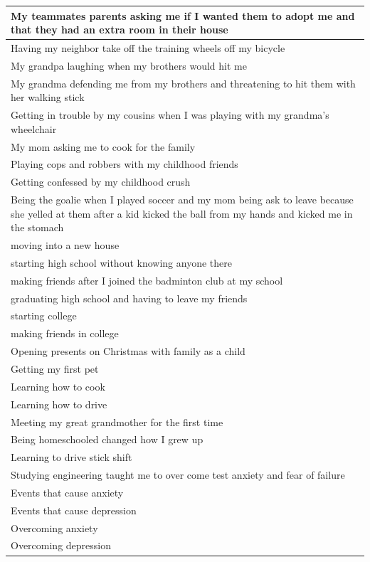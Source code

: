 \documentclass[
  .7em,
  letterpaper,
  DIV=11,
  numbers=noendperiod]{scrartcl}
\begin{document}
\begin{table}
\begin{tabular}{l}
My teammates parents asking me if I wanted them to adopt me and that they had an extra room in their house\\
\hline
Having my neighbor take off the training wheels off my bicycle\\
\hline
My grandpa laughing when my brothers would hit me\\
\hline
My grandma defending me from my brothers and threatening to hit them with her walking stick\\
\hline
Getting in trouble by my cousins when I was playing with my grandma's wheelchair\\
\hline
My mom asking me to cook for the family\\
\hline
Playing cops and robbers with my childhood friends\\
\hline
Getting confessed by my childhood crush\\
\hline
Being the goalie when I played soccer and my mom being ask to leave because she yelled at them after a kid kicked the ball from my hands and kicked me in the stomach\\
\hline
moving into a new house\\
\hline
starting high school without knowing anyone there\\
\hline
making friends after I joined the badminton club at my school\\
\hline
graduating high school and having to leave my friends\\
\hline
starting college\\
\hline
making friends in college\\
\hline
Opening presents on Christmas with family as a child\\
\hline
Getting my first pet\\
\hline
Learning how to cook\\
\hline
Learning how to drive\\
\hline
Meeting my great grandmother for the first time\\
\hline
Being homeschooled changed how I grew up\\
\hline
Learning to drive stick shift\\
\hline
Studying engineering taught me to over come test anxiety and fear of failure\\
\hline
Events that cause anxiety\\
\hline
Events that cause depression\\
\hline
Overcoming anxiety\\
\hline
Overcoming depression\\

\end{tabular}
\end{table}
\end{document}
